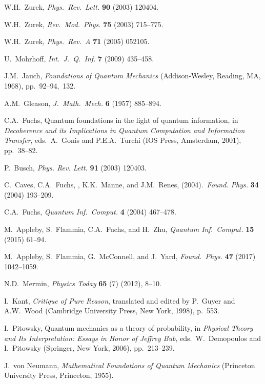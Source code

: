 \documentclass[smallextended]{svjour3}
\begin{document}
\begin{thebibliography}{99}
 W.H.\ Zurek, \textit{Phys.\ Rev.\ Lett.} \textbf{90} (2003) 120404.

 W.H.\ Zurek,  \textit{Rev.\ Mod.\ Phys.} \textbf{75} (2003) 715--775.

 W.H.\ Zurek, \textit{Phys.\ Rev.\ A} \textbf{71} (2005) 052105.

 U.\ Mohrhoff, \emph{Int.\ J.\ Q.\ Inf.} \textbf{7} (2009) 435--458.

 J.M.\ Jauch, \emph{Foundations of Quantum Mechanics} (Addison-Wesley, Reading, MA, 1968), pp.\ 92--94,~132.

 A.M.\ Gleason, \emph{J.\ Math.\ Mech.} \textbf{6} (1957) 885--894.

 C.A.\ Fuchs, Quantum foundations in the light of quantum information, in \textit{Decoherence and its Implications in Quantum Computation and Information Transfer}, eds.\ A.\ Gonis and P.E.A.\ Turchi (IOS Press, Amsterdam, 2001), pp.\ 38--82.

 P.\ Busch, \emph{Phys. Rev. Lett.} \textbf{91} (2003) 120403.

 C.\ Caves,  C.A.\ Fuchs, , K.K.\ Manne,  and J.M.\ Renes, (2004).\ \emph{Found. Phys.} \textbf{34} (2004) 193--209.

 C.A.\ Fuchs, \textit{Quantum Inf.\ Comput.} \textbf{4} (2004) 467--478.

 M.\ Appleby, S.\ Flammia,  C.A.\ Fuchs, and H.\ Zhu, \textit{Quantum Inf.\ Comput.} \textbf{15} (2015) 61--94.

 M.\ Appleby, S.\ Flammia, G.\ McConnell, and J.\ Yard, \textit{Found.\ Phys.} \textbf{47} (2017) 1042--1059.

 N.D.\ Mermin, \textit{Physics Today} \textbf{65} (7) (2012), 8--10.

 I.\ Kant, \emph{Critique of Pure Reason}, translated and edited by P.\ Guyer and A.W.\ Wood (Cambridge University Press, New York, 1998), p.~553.

  I.\ Pitowsky, Quantum mechanics as a theory of probability, in \textit{Physical Theory and Its Interpretation: Essays in Honor of Jeffrey Bub}, eds.\ W.\ Demopoulos and I.\ Pitowsky (Springer, New York, 2006), pp.\ 213--239.

 J.\ von Neumann, \emph{Mathematical Foundations of Quantum Mechanics} (Princeton University Press,  Princeton, 1955). 


\end{thebibliography}
\end{document}
